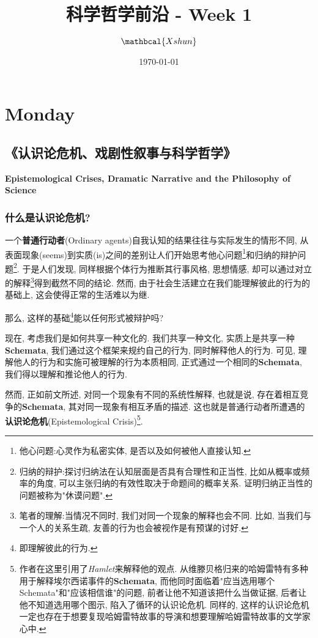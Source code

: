 \documentclass[12pt, a4paper, oneside]{ctexart}
\title{\textbf{科学哲学前沿 - Week 1}}
\author{$\mathbcal{Xshun}$}
\date{\today}
\renewcommand{\b}{\textbf}
\newcommand{\f}{\footnote}
\begin{document}
\maketitle
{
\hypersetup{linkcolor=red}
\tableofcontents
}
\section {Monday}
\subsection{《认识论危机、戏剧性叙事与科学哲学》}
{\centering\textbf{Epistemological Crises, Dramatic Narrative and the Philosophy of Science}}
\subsubsection{什么是认识论危机?}

一个\b{普通行动者}(Ordinary agents)自我认知的结果往往与实际发生的情形不同, 从表面现象(seems)到实质(is)之间的差别让人们开始思考他心问题\f{他心问题:心灵作为私密实体, 是否以及如何被他人直接认知. }和归纳的辩护问题\f{归纳的辩护:探讨归纳法在认知层面是否具有合理性和正当性, 比如从概率或频率的角度, 可以主张归纳的有效性取决于命题间的概率关系. 证明归纳正当性的问题被称为"休谟问题". }. 于是人们发现, 同样根据个体行为推断其行事风格, 思想情感, 却可以通过对立的解释\f{笔者的理解:当情况不同时, 我们对同一个现象的解释也会不同. 比如, 当我们与一个人的关系生疏, 友善的行为也会被视作是有预谋的讨好. }得到截然不同的结论. 然而, 由于社会生活建立在我们能理解彼此的行为的基础上, 这会使得正常的生活难以为继. 

那么, 这样的基础\f{即理解彼此的行为. }能以任何形式被辩护吗?

现在, 考虑我们是如何共享一种文化的. 我们共享一种文化, 实质上是共享一种\b{Schemata}, 我们通过这个框架来规约自己的行为, 同时解释他人的行为. 可见, 理解他人的行为和实施可被理解的行为本质相同, 正式通过一个相同的\b{Schemata}, 我们得以理解和推论他人的行为.

然而, 正如前文所述, 对同一个现象有不同的系统性解释, 也就是说, 存在着相互竞争的\b{Schemata}, 其对同一现象有相互矛盾的描述. 这也就是普通行动者所遭遇的\b{认识论危机}(Epistemological Crisis)\f{作者在这里引用了\textit{Hamlet}来解释他的观点. 从维滕贝格归来的哈姆雷特有多种用于解释埃尔西诺事件的\b{Schemata}, 而他同时面临着"应当选用哪个Schemata"和"应该相信谁"的问题, 前者让他不知道该把什么当做证据, 后者让他不知道选用哪个图示, 陷入了循环的认识论危机. 同样的, 这样的认识论危机一定也存在于想要复现哈姆雷特故事的导演和想要理解哈姆雷特故事的文学家心中. }. 
\end{document}
